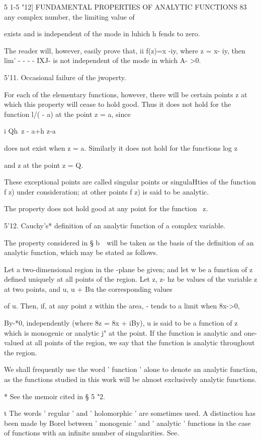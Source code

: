 5 1-5 "12] FUNDAMENTAL PROPERTIES OF ANALYTIC FUNCTIONS 83 any complex
number, the limiting value of

exists and is independent of the mode in luhich h fends to zero.

The reader will, however, easily prove that, ii f(z)=x -iy, where z =
x- iy, then lim' - - - - IXJ- is not independent of the mode in which
A- >0.

5'11. Occasional failure of the jwoperty.

For each of the elementary functions, however, there will be certain
points z at which this property will cease to hold good. Thus it does
not hold for the function l/( - a) at the point z = a, since

 i Qh\ z - a+h z-a

does not exist when z = a. Similarly it does not hold for the
functions log z

and z at the point z = Q.

These exceptional points are called singular points or singulaHties of
the function f z) under consideration; at other points f z) is said
to be analytic.

The property does not hold good at any point for the function \ z.

5'12. Cauchy's* definition of an analytic function of a complex
variable.

The property considered in § b\ \ will be taken as the basis of the
definition of an analytic function, which may be stated as follows.

Let a two-dimensional region in the -plane be given; and let w be a
function of z defined uniquely at all points of the region. Let z, z-
hz be values of the variable z at two points, and u, u + Bu the
corresponding values

of u. Then, if, at any point z within the area, - tends to a limit
when 8x->0,

By-*0, independently (where 8z = 8x + iBy), u is said to be a function
of z which is monogenic or analytic j" at the point. If the function
is analytic and one-valued at all points of the region, we say that
the function is analytic throughout the region.

We shall frequently use the word ' function ' alone to denote an
analytic function, as the functions studied in this work will be
almost exclusively analytic functions.

* See the memoir cited in § 5 "2.

t The words ' regular ' and ' holomorphic ' are sometimes used. A
distinctiou has been made by Borel between ' monogenic ' and '
analytic ' functions in the case of functions with an infinite number
of singularities. See.

